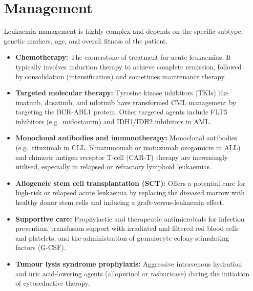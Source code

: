 \section*{Management}
Leukaemia management is highly complex and depends on the specific subtype, genetic markers, age, and overall fitness of the patient.
\begin{itemize}
    \item \textbf{Chemotherapy:} The cornerstone of treatment for acute leukaemias. It typically involves induction therapy to achieve complete remission, followed by consolidation (intensification) and sometimes maintenance therapy.
    \item \textbf{Targeted molecular therapy:} Tyrosine kinase inhibitors (TKIs) like imatinib, dasatinib, and nilotinib have transformed CML management by targeting the BCR-ABL1 protein. Other targeted agents include FLT3 inhibitors (e.g.\ midostaurin) and IDH1/IDH2 inhibitors in AML.
    \item \textbf{Monoclonal antibodies and immunotherapy:} Monoclonal antibodies (e.g.\ rituximab in CLL, blinatumomab or inotuzumab ozogamicin in ALL) and chimeric antigen receptor T-cell (CAR-T) therapy are increasingly utilised, especially in relapsed or refractory lymphoid leukaemias.
    \item \textbf{Allogeneic stem cell transplantation (SCT):} Offers a potential cure for high-risk or relapsed acute leukaemia by replacing the diseased marrow with healthy donor stem cells and inducing a graft-versus-leukaemia effect.
    \item \textbf{Supportive care:} Prophylactic and therapeutic antimicrobials for infection prevention, transfusion support with irradiated and filtered red blood cells and platelets, and the administration of granulocyte colony-stimulating factors (G-CSF).
    \item \textbf{Tumour lysis syndrome prophylaxis:} Aggressive intravenous hydration and uric acid-lowering agents (allopurinol or rasburicase) during the initiation of cytoreductive therapy.
\end{itemize}

